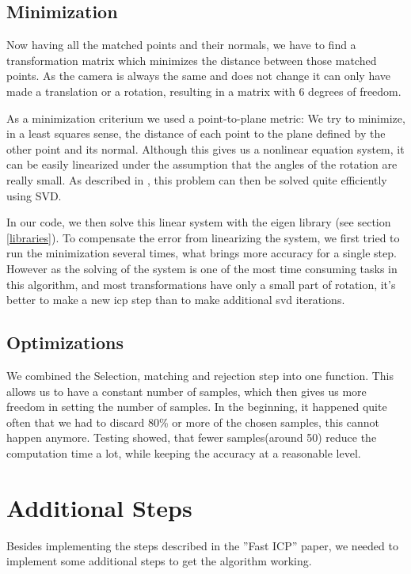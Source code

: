 \documentclass[10pt,twocolumn,letterpaper]{article}
\begin{document}
\subsection{Minimization}
\label{minimization}
Now having all the matched points and their normals, we have to find a transformation matrix which minimizes the distance between those matched points.
As the camera is always the same and does not change it can only have made a translation or a rotation, resulting in a matrix with 6 degrees of freedom.

As a minimization criterium we used a point-to-plane metric: We try to minimize, in a least squares sense, the distance of each point to the plane
defined by the other point and its normal. Although this gives us a nonlinear equation system, it can be easily linearized under the assumption
that the angles of the rotation are really small. As described in \cite{ptp}, this problem can then be solved quite efficiently using SVD.

In our code, we then solve this linear system with the eigen library (see section \ref{libraries}).
To compensate the error from linearizing the system, we first tried to run the minimization several times, what brings more accuracy for a single step. 
However as the solving of the system is one of the most time consuming tasks in this algorithm,
and most transformations have only a small part of rotation, it's better to make a new icp step than to make additional svd iterations.

\subsection{Optimizations}
We combined the Selection, matching and rejection step into one function. This allows us to have a constant number of samples,
which then gives us more freedom in setting the number of samples. In the beginning, it happened quite often that we had to discard
80\% or more of the chosen samples, this cannot happen anymore. Testing showed, that fewer samples(around 50) reduce the computation
time a lot, while keeping the accuracy at a reasonable level.

\section{Additional Steps}
Besides implementing the steps described in the ''Fast ICP''\cite{fasticp} paper,
we needed to implement some additional steps to get the algorithm working.
\end{document}
